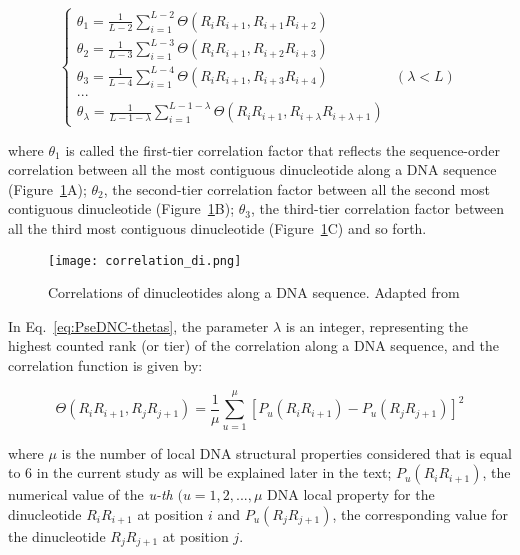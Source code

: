 \begin{equation}\label{eq:PseDNC-thetas}
    \begin{cases}
    \theta_{1} = \frac{1}{L-2} \sum_{i=1}^{L-2}\Theta(R_{i}R_{i+1}, R_{i+1}R_{i+2})
    \\ 
    \theta_{2} = \frac{1}{L-3} \sum_{i=1}^{L-3}\Theta(R_{i}R_{i+1}, R_{i+2}R_{i+3})
    \\ 
    \theta_{3} = \frac{1}{L-4} \sum_{i=1}^{L-4}\Theta(R_{i}R_{i+1}, R_{i+3}R_{i+4}) & (\lambda < L)
    \\
    ...
    \\ 
    \theta_{\lambda} = \frac{1}{L-1-\lambda} \sum_{i=1}^{L-1-\lambda}\Theta(R_{i}R_{i+1}, R_{i+\lambda}R_{i+\lambda+1})
    \end{cases}
\end{equation}

where $\theta_{1}$ is called the first-tier correlation factor that reflects the sequence-order correlation between all the most contiguous dinucleotide along a DNA sequence (Figure~\ref{fig:psednc_correlation}A); $\theta_{2}$, the second-tier correlation factor between all the second most contiguous dinucleotide (Figure~\ref{fig:psednc_correlation}B); $\theta_{3}$, the third-tier correlation factor between all the third most contiguous dinucleotide (Figure~\ref{fig:psednc_correlation}C) and so forth.

\begin{figure}[htbp]
    \centering
    \texttt{[image: correlation\_di.png]}
    \caption{Correlations of dinucleotides along a DNA sequence. Adapted from~\cite{Chen2014PseKNC:Composition}}
    \label{fig:psednc_correlation}
\end{figure}


In Eq.~\ref{eq:PseDNC-thetas}, the parameter $\lambda$ is an integer, representing the highest counted rank (or tier) of the correlation along a DNA sequence, and the correlation function is given by:

\begin{equation}\label{eq:PseDNC-5}
    \Theta(R_{i}R_{i+1}, R_{j}R_{j+1}) = \frac{1}{\mu}\sum_{u=1}^{\mu}[P_{u} (R_{i}R_{i+1}) - P_{u}(R_{j}R_{j+1})]^{2}
\end{equation}

where $\mu$ is the number of local DNA structural properties considered that is equal to 6 in the current study as will be explained later in the text; $P_{u} (R_{i}R_{i+1})$⁠, the numerical value of the \textit{u-th} $(u = 1,2,...,\mu$ DNA local property for the dinucleotide $R_{i}R_{i+1}$ at position $i$ and $P_{u}(R_{j}R_{j+1})$⁠, the corresponding value for the dinucleotide $R_{j}R_{j+1}$ at position $j$.


